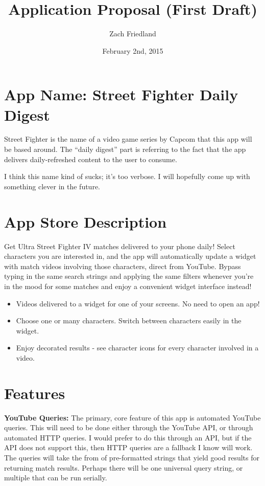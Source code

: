 \documentclass[10pt,letterpaper,final]{article}
\title{Application Proposal (First Draft)}
\author{Zach Friedland}
\date{February 2nd, 2015}
\begin{document}
\maketitle

\section*{App Name: Street Fighter Daily Digest}
Street Fighter is the name of a video game series by Capcom that this app will be based around. The ``daily digest'' part is referring to the fact that the app delivers daily-refreshed content to the user to consume.

I think this name kind of sucks; it's too verbose. I will hopefully come up with something clever in the future.

\section*{App Store Description}
Get Ultra Street Fighter IV matches delivered to your phone daily! Select characters you are interested in, and the app will automatically update a widget with match videos involving those characters, direct from YouTube. Bypass typing in the same search strings and applying the same filters whenever you're in the mood for some matches and enjoy a convenient widget interface instead!

\begin{itemize}
  \item Videos delivered to a widget for one of your screens. No need to open an app!
  \item Choose one or many characters. Switch between characters easily in the widget.
  \item Enjoy decorated results - see character icons for every character involved in a video.
\end{itemize}

\section*{Features}
\textbf{YouTube Queries:} The primary, core feature of this app is automated YouTube queries. This will need to be done either through the YouTube API, or through automated HTTP queries. I would prefer to do this through an API, but if the API does not support this, then HTTP queries are a fallback I know will work. The queries will take the from of pre-formatted strings that yield good results for returning match results. Perhaps there will be one universal query string, or multiple that can be run serially.
\end{document}

